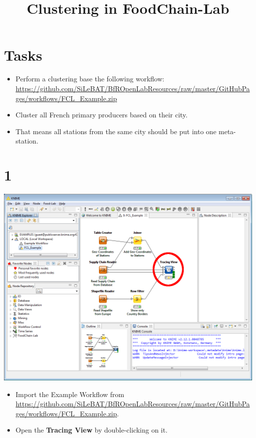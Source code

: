 \documentclass{beamer}
\title{Clustering in FoodChain-Lab}
\date{}
\begin{document}
\maketitle

\section{Tasks}
\begin{frame}
	\begin{itemize}
		\item Perform a clustering base the following workflow: \url{https://github.com/SiLeBAT/BfROpenLabResources/raw/master/GitHubPages/workflows/FCL_Example.zip}
		\item Cluster all French primary producers based on their city.
		\item That means all stations from the same city should be put into one meta-station.
	\end{itemize}
\end{frame}
 
\section{1}
\begin{frame}
	\begin{center}
  		\includegraphics[height=0.6\textheight]{1.png}
	\end{center}
	\begin{itemize}
		\item Import the Example Workflow from \url{https://github.com/SiLeBAT/BfROpenLabResources/raw/master/GitHubPages/workflows/FCL_Example.zip}.
		\item Open the \textbf{Tracing View} by double-clicking on it.
	\end{itemize}
\end{frame}
\end{document}

